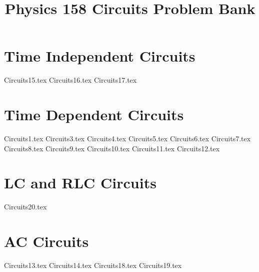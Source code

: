 \documentclass[11pt, fleqn]{article}
\title{Physics 158 Circuits Problem Bank}
\author{}
\date{}
\begin{document}
\allowdisplaybreaks

\maketitle

\section*{Time Independent Circuits}
{Circuits15.tex}
{Circuits16.tex}
{Circuits17.tex}

\section*{Time Dependent Circuits}
{Circuits1.tex}
{Circuits3.tex}
{Circuits4.tex}
{Circuits5.tex}
{Circuits6.tex}
{Circuits7.tex}
{Circuits8.tex}
{Circuits9.tex}
{Circuits10.tex}
{Circuits11.tex}
{Circuits12.tex}

\section*{LC and RLC Circuits}
{Circuits20.tex}

\section*{AC Circuits}
{Circuits13.tex}
{Circuits14.tex}
{Circuits18.tex}
{Circuits19.tex}
\end{document}
